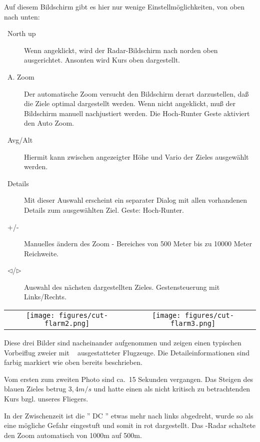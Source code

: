 Auf diesem Bildschirm gibt es hier nur wenige Einstellmöglichkeiten, von oben nach unten:

\begin{description}
\item[~North up~]  Wenn angeklickt, wird der Radar-Bildschirm nach norden oben ausgerichtet.
Ansonten wird Kurs oben dargestellt.
\item[~A. Zoom~]    Der automatische Zoom versucht den Bildschirm derart darzustellen, daß die
Ziele optimal dargestellt werden.
Wenn nicht angeklickt, muß der Bildschirm manuell nachjustiert werden.
Die Hoch-Runter Geste aktiviert den Auto Zoom.
\item[~Avg/Alt~]   Hiermit kann zwischen angezeigter Höhe und Vario der Zieles ausgewählt werden.
\item[~Details~]    Mit dieser Auswahl erscheint ein separater
Dialog mit allen vorhandenen Details zum ausgewählten Ziel. Geste: Hoch-Runter.
\item[~+/-~ ]  Manuelles ändern des Zoom - Bereiches von 500 Meter bis
zu 10000 Meter Reichweite.
\item[~$\triangleleft$/$\triangleright$~]    Auswahl des nächsten dargestellten Zieles.
Gestensteuerung mit Links/Rechts.
\end{description}

\begin{center}
\begin{tabular}{c c}
\texttt{[image: figures/cut-flarm2.png]}&
\texttt{[image: figures/cut-flarm3.png]}\\
\end{tabular}
\end{center}
Diese drei Bilder sind nacheinander aufgenommen und zeigen einen typischen Vorbeiflug zweier
mit \fl~ ausgestatteter Flugzeuge. Die Detaileinformationen sind farbig markiert wie oben bereits
beschrieben.

Vom ersten zum zweiten Photo sind ca.\ 15 Sekunden vergangen.
Das Steigen des blauen Zieles betrug $3,4m/s$ und hatte einen als nicht
kritisch zu betrachtenden Kurs bzgl. unseres Fliegers.

In der Zwischenzeit  ist die '' DC '' etwas mehr nach links abgedreht, wurde so als
eine mögliche Gefahr eingestuft und somit in rot dargestellt.
Das \fl-Radar schaltete den Zoom automatisch von 1000m auf 500m.

